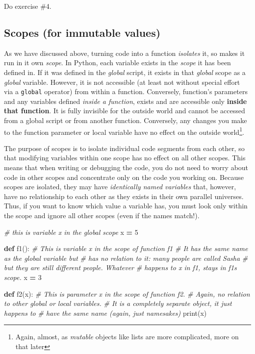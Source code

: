 \documentclass[
]{book}
\newenvironment{Shaded}{\begin{snugshade}}{\end{snugshade}}
\newcommand{\BuiltInTok}[1]{#1}
\newcommand{\CommentTok}[1]{\textcolor[rgb]{0.56,0.35,0.01}{\textit{#1}}}
\newcommand{\DecValTok}[1]{\textcolor[rgb]{0.00,0.00,0.81}{#1}}
\newcommand{\KeywordTok}[1]{\textcolor[rgb]{0.13,0.29,0.53}{\textbf{#1}}}
\newcommand{\NormalTok}[1]{#1}
\newcommand{\OperatorTok}[1]{\textcolor[rgb]{0.81,0.36,0.00}{\textbf{#1}}}
\begin{document}
Do exercise \#4.

\hypertarget{scopes-for-immutable-values}{%
\subsection{Scopes (for immutable values)}\label{scopes-for-immutable-values}}

As we have discussed above, turning code into a function \emph{isolates} it, so makes it run in it own \emph{scope}. In Python, each variable exists in the \emph{scope} it has been defined in. If it was defined in the \emph{global} script, it exists in that \emph{global} scope as a \emph{global} variable. However, it is not accessible (at least not without special effort via a \texttt{global} operator) from within a function. Conversely, function's parameters and any variables defined \emph{inside a function}, exists and are accessible only \textbf{inside that function}. It is fully invisible for the outside world and cannot be accessed from a global script or from another function. Conversely, any changes you make to the function parameter or local variable have no effect on the outside world\footnote{Again, almost, as \emph{mutable} objects like lists are more complicated, more on that later}.

The purpose of scopes is to isolate individual code segments from each other, so that modifying variables within one scope has no effect on all other scopes. This means that when writing or debugging the code, you do not need to worry about code in other scopes and concentrate only on the code you working on. Because scopes are isolated, they may have \emph{identically named variables} that, however, have no relationship to each other as they exists in their own parallel universes. Thus, if you want to know which value a variable has, you must look only within the scope and ignore all other scopes (even if the names match!).

\begin{Shaded}
\begin{Highlighting}[]
\CommentTok{\# this is variable \textasciigrave{}x\textasciigrave{} in the global scope}
\NormalTok{x  }\OperatorTok{=} \DecValTok{5} 

\KeywordTok{def}\NormalTok{ f1():}
  \CommentTok{\# This is variable \textasciigrave{}x\textasciigrave{} in the scope of function f1}
  \CommentTok{\# It has the same name as the global variable but}
  \CommentTok{\# has no relation to it: many people are called Sasha }
  \CommentTok{\# but they are still different people. Whatever}
  \CommentTok{\# happens to \textasciigrave{}x\textasciigrave{} in f1, stays in f1\textquotesingle{}s scope.}
\NormalTok{  x }\OperatorTok{=} \DecValTok{3}
  
  
\KeywordTok{def}\NormalTok{ f2(x):}
  \CommentTok{\# This is parameter \textasciigrave{}x\textasciigrave{} in the scope of function f2.}
  \CommentTok{\# Again, no relation to other global or local variables.}
  \CommentTok{\# It is a completely separate object, it just happens to }
  \CommentTok{\# have the same name (again, just namesakes)}
  \BuiltInTok{print}\NormalTok{(x)}
\end{Highlighting}
\end{Shaded}
\end{document}
